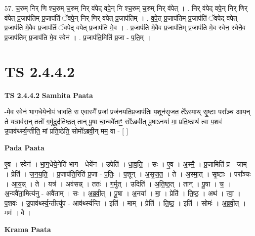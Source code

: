 \documentclass[17pt]{extarticle}
\begin{document}
57. च॒रुम् निर् णि श्च॒रुम् च॒रुम् निर् व॑पेद् वपे॒न् नि श्च॒रुम् च॒रुम् निर् व॑पेत् । . निर् व॑पेद् वपे॒न् निर् णिर् व॑पेत् प्र॒जाप॑तिम् प्र॒जाप॑तिं ॅवपे॒न् निर् णिर् व॑पेत् प्र॒जाप॑तिम् । . व॒पे॒त् प्र॒जाप॑तिम् प्र॒जाप॑तिं ॅवपेद् वपेत् प्र॒जाप॑ति मे॒वैव प्र॒जाप॑तिं ॅवपेद् वपेत् प्र॒जाप॑ति मे॒व । . प्र॒जाप॑ति मे॒वैव प्र॒जाप॑तिम् प्र॒जाप॑ति मे॒व स्वेन॒ स्वेनै॒व प्र॒जाप॑तिम् प्र॒जाप॑ति मे॒व स्वेन॑ । . प्र॒जाप॑ति॒मिति॑ प्र॒जा - प॒ति॒म् । \newline
\pagebreak
{}

\section{ TS 2.4.4.2 }

\textbf{TS 2.4.4.2 } \newline
\textbf{Samhita Paata} \newline

-मे॒व स्वेन॑ भाग॒धेये॒नोप॑ धावति॒ स ए॒वास्मै᳚ प्र॒जां प्रज॑नयतिप्र॒जाप॑तिः प॒शून॑सृजत॒ ते᳚ऽस्माथ् सृ॒ष्टाः परा᳚ञ्च आय॒न् ते यत्राव॑स॒न् ततो॑ ग॒र्मुदुद॑तिष्ठ॒त् तान् पू॒षा चा॒न्ववै॑ताꣳ॒॒ सो᳚ऽब्रवीत् पू॒षाऽनया॑ मा॒ प्रति॒ष्ठाथ॑ त्वा प॒शव॑ उ॒पाव॑र्थ्स्य॒न्तीति॒ मां प्रति॒ष्ठेति॒ सोमो᳚ऽब्रवी॒न् मम॒ वा - [  ] \newline

\textbf{Pada Paata} \newline

ए॒व । स्वेन॑ । भा॒ग॒धेये॒नेति॑ भाग - धेये॑न । उपेति॑ । धा॒व॒ति॒ । सः । ए॒व । अ॒स्मै॒ । प्र॒जामिति॑ प्र - जाम् । प्रेति॑ । ज॒न॒य॒ति॒ । प्र॒जाप॑ति॒रिति॑ प्र॒जा - प॒तिः॒ । प॒शून् । अ॒सृ॒ज॒त॒ । ते । अ॒स्मा॒त् । सृ॒ष्टाः । परा᳚ञ्चः । आ॒य॒न्न् । ते । यत्र॑ । अव॑सन्न् । ततः॑ । ग॒र्मुत् । उदिति॑ । अ॒ति॒ष्ठ॒त् । तान् । पू॒षा । च॒ । अ॒न्ववै॑ता॒मित्य॑नु - अवै॑ताम् । सः । अ॒ब्र॒वी॒त् । पू॒षा । अ॒नया᳚ । मा॒ । प्रेति॑ । ति॒ष्ठ॒ । अथ॑ । त्वा॒ । प॒शवः॑ । उ॒पाव॑र्थ्स्य॒न्तीत्यु॑प - आव॑र्थ्स्यन्ति । इति॑ । माम् । प्रेति॑ । ति॒ष्ठ॒ । इति॑ । सोमः॑ । अ॒ब्र॒वी॒त् । मम॑ । वै ।  \newline


\textbf{Krama Paata} \newline
\end{document}
